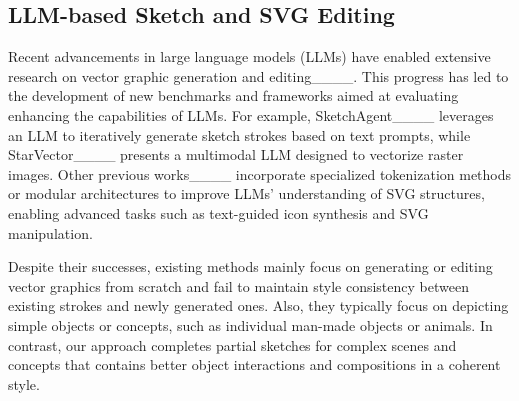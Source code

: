 \subsection{LLM-based Sketch and SVG Editing}
Recent advancements in large language models (LLMs) have enabled extensive research on vector graphic generation and editing____.
This progress has led to the development of new benchmarks and frameworks aimed at evaluating enhancing the capabilities of LLMs.
For example, SketchAgent____ leverages an LLM to iteratively generate sketch strokes based on text prompts, while StarVector____ presents a multimodal LLM designed to vectorize raster images.
Other previous works____ incorporate specialized tokenization methods or modular architectures to improve LLMs’ understanding of SVG structures, enabling advanced tasks such as text-guided icon synthesis and SVG manipulation. 

Despite their successes, existing methods mainly focus on generating or editing vector graphics from scratch and fail to maintain style consistency between existing strokes and newly generated ones. 
Also, they typically focus on depicting simple objects or concepts, such as individual man-made objects or animals. 
In contrast, our approach completes partial sketches for complex scenes and concepts that contains better object interactions and compositions in a coherent style.